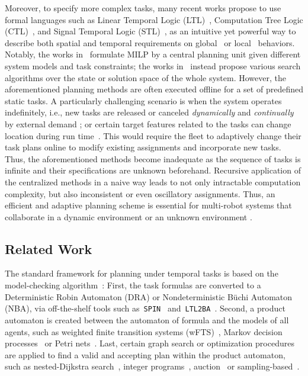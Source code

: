 Moreover, to specify more complex tasks,
many recent works propose to use formal languages
such as Linear Temporal Logic (LTL)~\cite{Katoen2008Principles}, Computation Tree Logic (CTL)~\cite{koymans1990specifying},
and Signal Temporal Logic (STL)~\cite{maler2004monitoring}, as an intuitive yet
powerful way to describe both spatial and temporal requirements on
global~\cite{luo2021abstraction} or local~\cite{guo2016task} behaviors.
Notably, the works in~\cite{luo2021temporal, sahin2019multirobot, jones2019scratchs}
formulate MILP by a central planning unit given different system models and task constraints;
the works in~\cite{2016Decomposition,schillinger2018simultaneous,kantaros2020stylus}
instead propose various search algorithms over the state or solution space of the whole system.
However, the aforementioned planning methods are often executed {offline}
for a set of predefined {static} tasks.
A particularly challenging scenario is when the system operates indefinitely,
i.e., new tasks are released or canceled \emph{dynamically} and \emph{continually}
by external demand \cite{7306591};
or certain target features related to the tasks can change location
during run time~\cite{doi:10.34133/research.0246}.
This would require the fleet to adaptively change their task plans online to modify
existing assignments and incorporate new tasks.
Thus, the aforementioned methods become inadequate as the sequence of tasks is infinite
and their specifications are unknown beforehand.
Recursive application of the centralized methods in a naive way leads to
not only intractable computation complexity,
but also inconsistent or even oscillatory assignments.
Thus, an efficient and adaptive planning scheme is essential for multi-robot systems
that collaborate in a dynamic environment \cite{8901075,10102342,choudhury2022dynamic}
or an unknown environment \cite{9884983}.


\subsection{Related Work} \label{related-work}
The standard framework for planning under temporal tasks is based on the model-checking algorithm~\cite{Katoen2008Principles}:
First, the task formulas are converted to a Deterministic Robin Automaton (DRA)
or Nondeterministic B\"uchi Automaton (NBA),
via off-the-shelf tools such as~\texttt{SPIN}~\cite{ben2010primer} and~\texttt{LTL2BA}~\cite{10.1007/3-540-44585-4_6}.
Second, a product automaton is created between the automaton of formula and the models of all agents,
such as weighted finite transition systems (wFTS)~\cite{Katoen2008Principles}, Markov decision processes~\cite{6702421}
or Petri nets~\cite{7294096}.
Last, certain graph search or optimization procedures are applied to find a valid and accepting plan
within the product automaton, such as nested-Dijkstra search~\cite{schillinger2018simultaneous}, integer programs~\cite{9663414},
auction~\cite{schillinger2019hierarchical} or sampling-based~\cite{kantaros2020stylus}.

